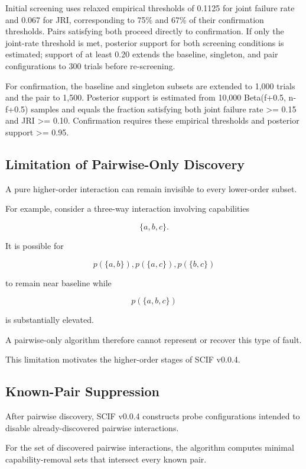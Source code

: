 Initial screening uses relaxed empirical thresholds of 0.1125 for joint failure rate and 0.067 for JRI, corresponding to 75\% and 67\% of their confirmation thresholds. Pairs satisfying both proceed directly to confirmation. If only the joint-rate threshold is met, posterior support for both screening conditions is estimated; support of at least 0.20 extends the baseline, singleton, and pair configurations to 300 trials before re-screening.

For confirmation, the baseline and singleton subsets are extended to 1,000 trials and the pair to 1,500. Posterior support is estimated from 10,000 Beta(f+0.5, n-f+0.5) samples and equals the fraction satisfying both joint failure rate \textgreater= 0.15 and JRI \textgreater= 0.10. Confirmation requires these empirical thresholds and posterior support \textgreater= 0.95.

\subsection{Limitation of Pairwise-Only Discovery}

A pure higher-order interaction can remain invisible to every lower-order subset.

For example, consider a three-way interaction involving capabilities

\[
\{a,b,c\}.
\]

It is possible for

\[
p(\{a,b\}),
p(\{a,c\}),
p(\{b,c\})
\]

to remain near baseline while

\[
p(\{a,b,c\})
\]

is substantially elevated.

A pairwise-only algorithm therefore cannot represent or recover this type of fault.

This limitation motivates the higher-order stages of SCIF v0.0.4.

\subsection{Known-Pair Suppression}

After pairwise discovery, SCIF v0.0.4 constructs probe configurations intended to disable already-discovered pairwise interactions.

For the set of discovered pairwise interactions, the algorithm computes minimal capability-removal sets that intersect every known pair.

